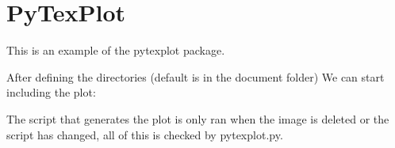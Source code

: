 \documentclass[12pt]{article}
\begin{document}
\section{PyTexPlot}

This is an example of the pytexplot package.

After defining the directories
(default is in the document folder)
We can start including the plot:


The script that generates the plot is only ran when the image is deleted or the script has changed, 
all of this is checked by pytexplot.py.

\end{document}
